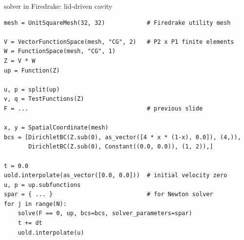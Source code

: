 \documentclass[10pt,hyperref,colorlinks]{beamer}
\begin{document}
\begin{frame}[fragile]{solver in Firedrake: lid-driven cavity}

\begin{verbatim}
mesh = UnitSquareMesh(32, 32)            # Firedrake utility mesh

V = VectorFunctionSpace(mesh, "CG", 2)   # P2 x P1 finite elements
W = FunctionSpace(mesh, "CG", 1)
Z = V * W
up = Function(Z)

u, p = split(up)
v, q = TestFunctions(Z)
F = ...                                  # previous slide

x, y = SpatialCoordinate(mesh)
bcs = [DirichletBC(Z.sub(0), as_vector([4 * x * (1-x), 0.0]), (4,)),
       DirichletBC(Z.sub(0), Constant((0.0, 0.0)), (1, 2)),]

t = 0.0
uold.interpolate(as_vector([0.0, 0.0]))  # initial velocity zero
u, p = up.subfunctions
spar = { ... }                           # for Newton solver
for j in range(N):
    solve(F == 0, up, bcs=bcs, solver_parameters=spar)
    t += dt
    uold.interpolate(u)
\end{verbatim}
\end{frame}
\end{document}
